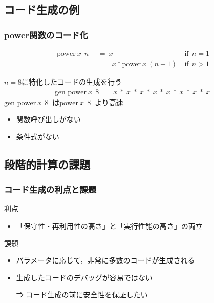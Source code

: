 \subsection{コード生成の例}
\begin{frame}
  \frametitle{power関数のコード化}
  \begin{align*}
    \text{power} ~x~ ~n~ &~=~ x &\text{if} ~~n = 1 \\
                         &~~~\phantom{=}~ x * \text{power} ~x~ (n-1)~ &\text{if} ~~n > 1
  \end{align*}

  \pause
  $n = 8$に特化したコードの生成を行う
  \begin{align*}
    \text{gen\_power} ~x~ ~8~ =~ ~x~ * ~x~ * ~x~ * ~x~ * ~x~ * ~x~ * ~x~ * ~x~
  \end{align*}
  \pause
  $\text{gen\_power} ~x~ ~8~$ は$\text{power} ~x~ ~8~$ より高速
  \begin{itemize}
  \item 関数呼び出しがない
  \item 条件式がない
  \end{itemize}
\end{frame}

\subsection{段階的計算の課題}

\begin{frame}
  \frametitle{コード生成の利点と課題}

  利点
  \begin{itemize}
  \item \alert{「保守性・再利用性の高さ」}と\alert{「実行性能の高さ」}の両立
  \end{itemize}

  \pause

  課題
  \begin{itemize}
  \item パラメータに応じて，非常に多数のコードが生成される
  \item 生成したコードのデバッグが容易ではない
  \item [⇒] \alert{コード生成の前に安全性を保証}したい
  \end{itemize}
\end{frame}


